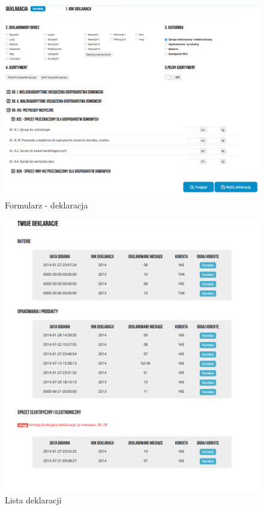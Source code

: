 \documentclass[paper=a4, fontsize=12pt]{scrartcl}
\numberwithin{equation}{section}		%
\numberwithin{figure}{section}			%
\numberwithin{table}{section}				%
\begin{document}
	\begin{figure}[H]
		\centering
		\centerline{\includegraphics[width=1.2\textwidth]{partials/2-wymagania/dokumenty/deklaracja-form.png}}
		\caption{Formularz - deklaracja}
	\end{figure}

	\begin{figure}[H]
		\centering
		\centerline{\includegraphics[width=1.2\textwidth]{partials/2-wymagania/dokumenty/deklaracje-lista.png}}
		\caption{Lista deklaracji}
	\end{figure}
\end{document}
